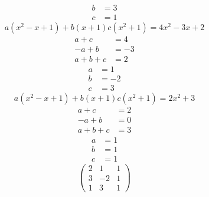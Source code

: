 \begin{enumerate}[(a)]
\begin{align}
b&=3\\
c&=1
\end{align}
\begin{equation}
a(x^2-x+1) + b(x+1) c(x^2 + 1) = 4x^2 -3x +2
\end{equation}
\begin{align}
a+c&=4\\
-a+b&=-3\\
a+b+c&=2
\end{align}
\begin{align}
a&=1\\
b&=-2\\
c&=3
\end{align}
\begin{equation}
a(x^2-x+1) + b(x+1) c(x^2 + 1) = 2x^2 +3
\end{equation}
\begin{align}
a+c&=2\\
-a+b&=0\\
a+b+c&=3
\end{align}
\begin{align}
a&=1\\
b&=1\\
c&=1
\end{align}
\begin{equation}
\begin{pmatrix}
2&1&1\\
3&-2&1\\
1&3&1
\end{pmatrix}
\end{equation}
\end{enumerate}
